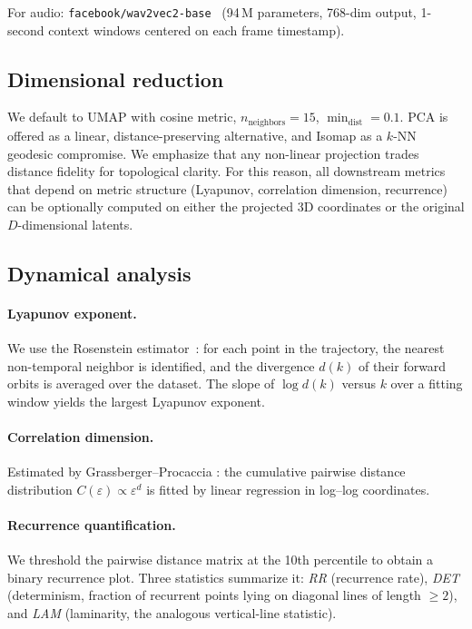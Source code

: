 \documentclass[11pt,a4paper]{article}
\begin{document}
For audio: \texttt{facebook/wav2vec2-base}~\cite{baevski2020wav2vec2}
(94\,M parameters, 768-dim output, 1-second context windows centered
on each frame timestamp).

\subsection{Dimensional reduction}

We default to UMAP with cosine metric, $n_{\text{neighbors}}=15$,
$\min_{\text{dist}}=0.1$. PCA is offered as a linear, distance-preserving
alternative, and Isomap as a $k$-NN geodesic compromise. We
emphasize that any non-linear projection trades distance fidelity
for topological clarity. For this reason, all downstream metrics
that depend on metric structure (Lyapunov, correlation dimension,
recurrence) can be optionally computed on either the projected 3D
coordinates or the original $D$-dimensional latents.

\subsection{Dynamical analysis}

\paragraph{Lyapunov exponent.} We use the Rosenstein
estimator~\cite{rosenstein1993}: for each point in the trajectory,
the nearest non-temporal neighbor is identified, and the divergence
$d(k)$ of their forward orbits is averaged over the dataset. The
slope of $\log d(k)$ versus $k$ over a fitting window yields the
largest Lyapunov exponent.

\paragraph{Correlation dimension.} Estimated by Grassberger--Procaccia
\cite{grassberger1983}: the cumulative pairwise distance distribution
$C(\varepsilon) \propto \varepsilon^d$ is fitted by linear regression
in log--log coordinates.

\paragraph{Recurrence quantification.} We threshold the pairwise
distance matrix at the 10th percentile to obtain a binary recurrence
plot. Three statistics summarize it: \emph{RR} (recurrence rate),
\emph{DET} (determinism, fraction of recurrent points lying on
diagonal lines of length $\geq 2$), and \emph{LAM} (laminarity, the
analogous vertical-line statistic).
\end{document}
